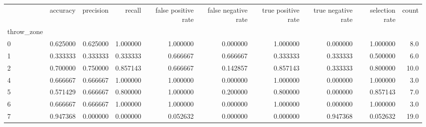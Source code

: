\begin{tabular}{lrrrrrrrrr}
\toprule
{} &  accuracy &  precision &    recall &  false positive rate &  false negative rate &  true positive rate &  true negative rate &  selection rate &  count \\
throw\_zone &           &            &           &                      &                      &                     &                     &                 &        \\
\midrule
0          &  0.625000 &   0.625000 &  1.000000 &             1.000000 &             0.000000 &            1.000000 &            0.000000 &        1.000000 &    8.0 \\
1          &  0.333333 &   0.333333 &  0.333333 &             0.666667 &             0.666667 &            0.333333 &            0.333333 &        0.500000 &    6.0 \\
2          &  0.700000 &   0.750000 &  0.857143 &             0.666667 &             0.142857 &            0.857143 &            0.333333 &        0.800000 &   10.0 \\
4          &  0.666667 &   0.666667 &  1.000000 &             1.000000 &             0.000000 &            1.000000 &            0.000000 &        1.000000 &    3.0 \\
5          &  0.571429 &   0.666667 &  0.800000 &             1.000000 &             0.200000 &            0.800000 &            0.000000 &        0.857143 &    7.0 \\
6          &  0.666667 &   0.666667 &  1.000000 &             1.000000 &             0.000000 &            1.000000 &            0.000000 &        1.000000 &    3.0 \\
7          &  0.947368 &   0.000000 &  0.000000 &             0.052632 &             0.000000 &            0.000000 &            0.947368 &        0.052632 &   19.0 \\
\bottomrule
\end{tabular}
